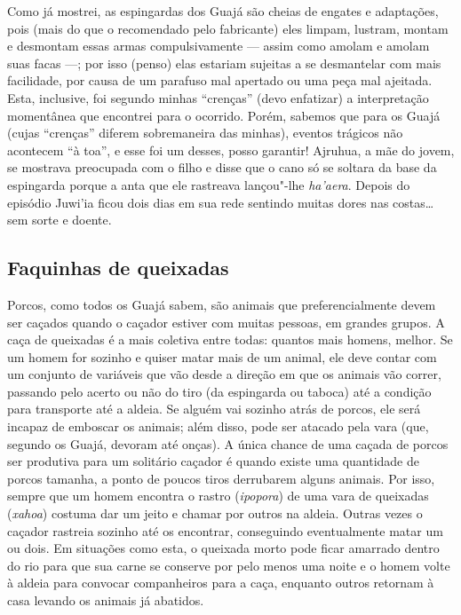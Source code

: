 Como já mostrei, as espingardas dos Guajá são cheias de engates e
adaptações, pois (mais do que o recomendado pelo fabricante) eles
limpam, lustram, montam e desmontam essas armas compulsivamente --- assim
como amolam e amolam suas facas ---; por isso (penso) elas estariam
sujeitas a se desmantelar com mais facilidade, por causa de um parafuso
mal apertado ou uma peça mal ajeitada. Esta, inclusive, foi segundo
minhas ``crenças'' (devo enfatizar) a interpretação momentânea que
encontrei para o ocorrido. Porém, sabemos que para os Guajá (cujas
``crenças'' diferem sobremaneira das minhas), eventos trágicos não
acontecem ``à toa'', e esse foi um desses, posso garantir! Ajruhua, a mãe
do jovem, se mostrava preocupada com o filho e disse que o cano só se
soltara da base da espingarda porque a anta que ele rastreava lançou"-lhe
\emph{ha'aera}. Depois do episódio Juwi'ia ficou dois dias em sua rede
sentindo muitas dores nas costas\ldots{} sem sorte e doente.

\subsection{Faquinhas de queixadas}

\forceindent
Porcos, como todos os Guajá sabem, são animais que preferencialmente
devem ser caçados quando o caçador estiver com muitas pessoas, em
grandes grupos. A caça de queixadas é a mais coletiva entre todas:
quantos mais homens, melhor. Se um homem for sozinho e quiser matar mais
de um animal, ele deve contar com um conjunto de variáveis que vão desde
a direção em que os animais vão correr, passando pelo acerto ou não do
tiro (da espingarda ou taboca) até a condição para transporte até a
aldeia. Se alguém vai sozinho atrás de porcos, ele será incapaz de
emboscar os animais; além disso, pode ser atacado pela vara (que,
segundo os Guajá, devoram até onças). A única chance de uma caçada de
porcos ser produtiva para um solitário caçador é quando existe uma
quantidade de porcos tamanha, a ponto de poucos tiros derrubarem alguns
animais. Por isso, sempre que um homem encontra o rastro
(\emph{ipopora}) de uma vara de queixadas (\emph{xahoa}) costuma dar um
jeito e chamar por outros na aldeia. Outras vezes o caçador rastreia
sozinho até os encontrar, conseguindo eventualmente matar um ou dois. Em
situações como esta, o queixada morto pode ficar amarrado dentro do rio
para que sua carne se conserve por pelo menos uma noite e o homem volte
à aldeia para convocar companheiros para a caça, enquanto outros
retornam à casa levando os animais já abatidos.

